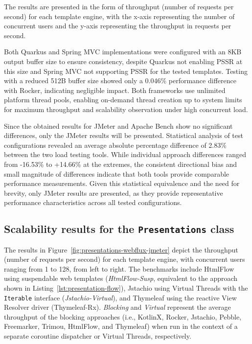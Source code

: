 The results are presented in the form of throughput (number of requests per
second) for each template engine, with the x-axis representing the number of
concurrent users and the y-axis representing the throughput in requests per
second.

Both Quarkus and Spring MVC implementations were configured with an 8KB output
buffer size to ensure consistency, despite Quarkus not enabling PSSR at this
size and Spring MVC not supporting PSSR for the tested templates. Testing with
a reduced 512B buffer size showed only a 0.046\% performance difference with
Rocker, indicating negligible impact. Both frameworks use unlimited platform
thread pools, enabling on-demand thread creation up to system limits for
maximum throughput and scalability observation under high concurrent load.

Since the obtained results for JMeter and Apache Bench show no significant
differences, only the JMeter results will be presented. Statistical analysis of
test configurations revealed an average absolute percentage difference of
2.83\% between the two load testing tools. While individual approach
differences ranged from -16.53\% to +14.66\% at the extremes, the consistent
directional bias and small magnitude of differences indicate that both tools
provide comparable performance measurements. Given this statistical equivalence
and the need for brevity, only JMeter results are presented, as they provide
representative performance characteristics across all tested configurations.

\subsection{Scalability results for the \texttt{Presentations} class} \label{sec:presentations-results}

The results in Figure~\ref{fig:presentations-webflux-jmeter} depict the
throughput (number of requests per second) for each template engine, with
concurrent users ranging from 1 to 128, from left to right. The benchmarks
include HtmlFlow using suspendable web templates (\textit{HtmlFlow-Susp},
equivalent to the approach shown in Listing~\ref{lst:presentation-flow}),
Jstachio using Virtual Threads with the \texttt{Iterable} interface
(\textit{Jstachio-Virtual}), and Thymeleaf using the reactive View Resolver
driver (Thymeleaf-Rx). \textit{Blocking} and \textit{Virtual} represent the
average throughput of the blocking approaches (i.e., KotlinX, Rocker, Jstachio,
Pebble, Freemarker, Trimou, HtmlFlow, and Thymeleaf) when run in the context of
a separate coroutine dispatcher or Virtual Threads, respectively.

